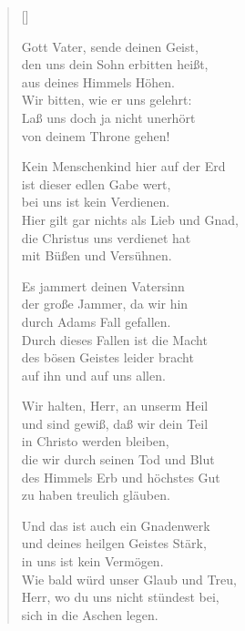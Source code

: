 \begin{multicols}{2}
\settowidth{\versewidth}{Kein Menschenkind hier auf der Erd}
\begin{verse}[\versewidth]

 Gott Vater, sende deinen Geist,\\
den uns dein Sohn erbitten heißt,\\
aus deines Himmels Höhen.\\
Wir bitten, wie er uns gelehrt:\\
Laß uns doch ja nicht unerhört\\
von deinem Throne gehen!

 Kein Menschenkind hier auf der Erd\\
ist dieser edlen Gabe wert,\\
bei uns ist kein Verdienen.\\
Hier gilt gar nichts als Lieb und Gnad,\\
die Christus uns verdienet hat\\
mit Büßen und Versühnen.

 Es jammert deinen Vatersinn\\
der große Jammer, da wir hin\\
durch Adams Fall gefallen.\\
Durch dieses Fallen ist die Macht\\
des bösen Geistes leider bracht\\
auf ihn und auf uns allen.

 Wir halten, Herr, an unserm Heil\\
und sind gewiß, daß wir dein Teil\\
in Christo werden bleiben,\\
die wir durch seinen Tod und Blut\\
des Himmels Erb und höchstes Gut\\
zu haben treulich gläuben.

 Und das ist auch ein Gnadenwerk\\
und deines heilgen Geistes Stärk,\\
in uns ist kein Vermögen.\\
Wie bald würd unser Glaub und Treu,\\
Herr, wo du uns nicht stündest bei,\\
sich in die Aschen legen.


\end{verse}
\end{multicols}
